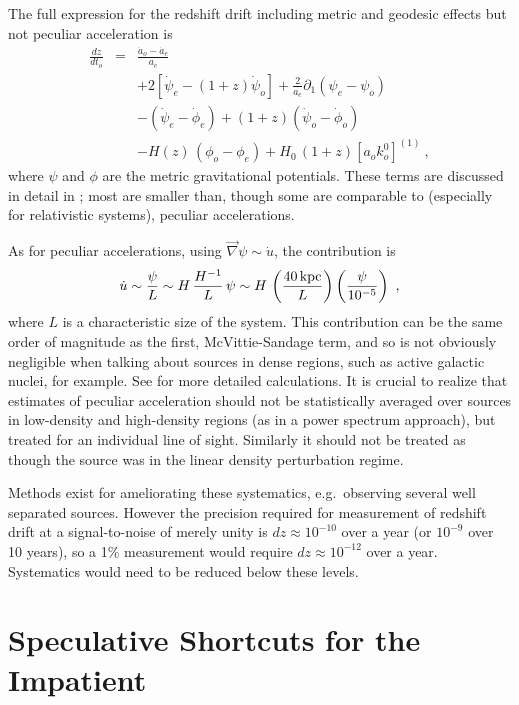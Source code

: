 \documentclass[preprint2, 10pt]{aastex}
\newcommand{\be}{\begin{equation}}
\newcommand{\ee}{\end{equation}}
\newcommand{\bea}{\begin{eqnarray}}
\newcommand{\eea}{\end{eqnarray}}
\begin{document}
The full expression for the redshift drift including metric and geodesic 
effects but not peculiar acceleration is 
\bea 
\frac{dz}{dt_o}&=&\frac{\dot a_o-\dot a_e}{a_e}\\ 
&&+2[\dot\psi_e-(1+z)\dot\psi_o]
+\frac{2}{a_e}\partial_1(\psi_e-\psi_o)\nonumber\\ 
&&-(\dot\psi_e-\dot\phi_e)+(1+z)(\dot\psi_o-\dot\phi_o)\nonumber\\ 
&&-H(z)\,(\phi_o-\phi_e)+H_0\,(1+z)[a_o k^0_o]^{(1)}\ ,\nonumber  
\eea 
where $\psi$ and $\phi$ are the metric gravitational potentials. 
These terms are discussed in detail in \citet{10044646}; most are smaller 
than, though some are comparable to (especially for relativistic systems), 
peculiar accelerations. 

As for peculiar accelerations, using 
$\vec\nabla\psi\sim \dot u$, the contribution is 
\be 
\dot u \sim \frac{\psi}{L}\sim H\,\frac{H^{-1}}{L}\,\psi\sim H\, 
\left(\frac{40\,{\rm kpc}}{L}\right)\left(\frac{\psi}{10^{-5}}\right)\ , 
\ee 
where $L$ is a characteristic size of the system.  This contribution can be 
the same order of magnitude as the first, McVittie-Sandage term, and so is 
not obviously negligible when talking about sources in dense regions, such 
as active galactic nuclei, for example. See \citet{amendola,uzan} for 
more detailed calculations. It is crucial to realize that estimates of 
peculiar acceleration should not be statistically averaged over sources in 
low-density and high-density regions (as in a power spectrum approach), 
but treated for an individual line of sight. 
Similarly it should not be treated as though the source was in the linear 
density perturbation regime. 

Methods exist for ameliorating these systematics, e.g.\ observing several 
well separated sources.  However the precision required for measurement of 
redshift drift at a signal-to-noise of merely unity is 
$dz\approx 10^{-10}$ over a year (or $10^{-9}$ over 10 years), 
so a 1\% measurement would require $dz\approx 10^{-12}$ over a year.  
Systematics would need to be reduced below these levels. 


\section{Speculative Shortcuts for the Impatient} \label{sec:methods} 
\end{document}
